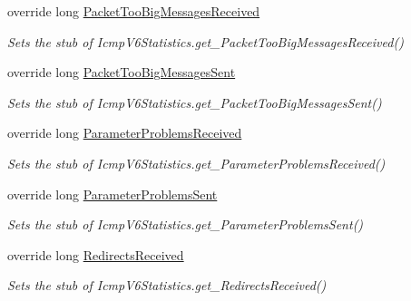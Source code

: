 \begin{DoxyCompactItemize}
override long \hyperlink{class_system_1_1_net_1_1_network_information_1_1_fakes_1_1_stub_icmp_v6_statistics_ac1785e5f4f201e189f888debfb9fda09}{Packet\-Too\-Big\-Messages\-Received}
\begin{DoxyCompactList}\small\item\em Sets the stub of Icmp\-V6\-Statistics.\-get\-\_\-\-Packet\-Too\-Big\-Messages\-Received()\end{DoxyCompactList}\item 
override long \hyperlink{class_system_1_1_net_1_1_network_information_1_1_fakes_1_1_stub_icmp_v6_statistics_aefbdd368ae76da0f88797ef837a60603}{Packet\-Too\-Big\-Messages\-Sent}
\begin{DoxyCompactList}\small\item\em Sets the stub of Icmp\-V6\-Statistics.\-get\-\_\-\-Packet\-Too\-Big\-Messages\-Sent()\end{DoxyCompactList}\item 
override long \hyperlink{class_system_1_1_net_1_1_network_information_1_1_fakes_1_1_stub_icmp_v6_statistics_a68f3d63729388ea73105812fe35ba195}{Parameter\-Problems\-Received}
\begin{DoxyCompactList}\small\item\em Sets the stub of Icmp\-V6\-Statistics.\-get\-\_\-\-Parameter\-Problems\-Received()\end{DoxyCompactList}\item 
override long \hyperlink{class_system_1_1_net_1_1_network_information_1_1_fakes_1_1_stub_icmp_v6_statistics_a185b9dff2d6e88753de208b3321f0fff}{Parameter\-Problems\-Sent}
\begin{DoxyCompactList}\small\item\em Sets the stub of Icmp\-V6\-Statistics.\-get\-\_\-\-Parameter\-Problems\-Sent()\end{DoxyCompactList}\item 
override long \hyperlink{class_system_1_1_net_1_1_network_information_1_1_fakes_1_1_stub_icmp_v6_statistics_af2e5108f5fdd40d1ba7c6faf7d661202}{Redirects\-Received}
\begin{DoxyCompactList}\small\item\em Sets the stub of Icmp\-V6\-Statistics.\-get\-\_\-\-Redirects\-Received()\end{DoxyCompactList}\item 

\end{DoxyCompactItemize}
